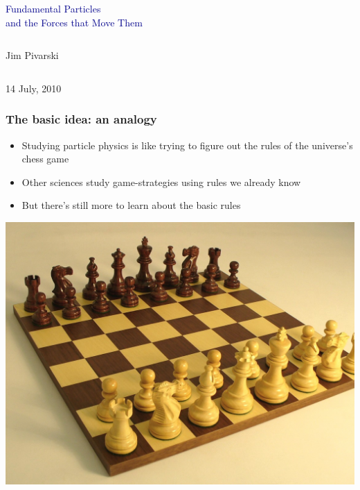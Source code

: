 \documentclass[compress]{beamer}
\begin{document}
\begin{frame}
\vfill
\begin{center}
\textcolor{darkblue}{\Large Fundamental Particles \\ \vspace{0.2 cm} and the Forces that Move Them}

\vfill
\begin{columns}
\begin{center}
\large
Jim Pivarski
\end{center}
\end{columns}

\vfill
14 July, 2010
\end{center}
\end{frame}


\small

\begin{frame}
\frametitle{The basic idea: an analogy}
\begin{itemize}
\item Studying particle physics is like trying to figure out the rules
  of the universe's chess game
\item Other sciences study game-strategies using rules we already know
\item But there's still more to learn about the basic rules
\end{itemize}

\begin{center}
\includegraphics[width=0.7\linewidth]{chessboard.jpg}
\end{center}
\end{frame}
\end{document}
